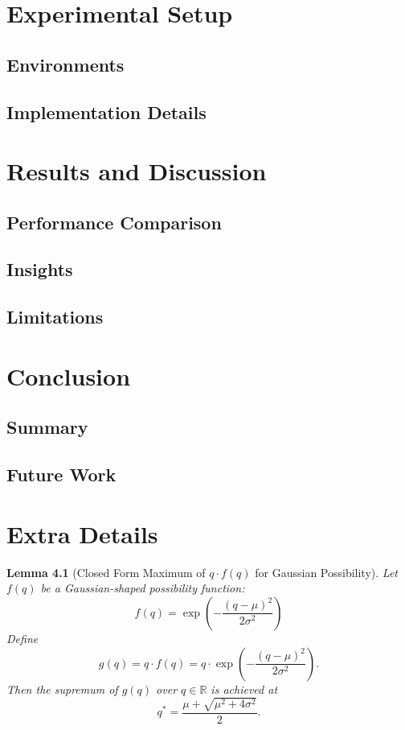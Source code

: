\documentclass[12pt,a4paper]{report}
\newtheorem{lemma}{Lemma}
\begin{document}
\chapter{Experimental Setup}
\section{Environments}
\section{Implementation Details}

\chapter{Results and Discussion}
\section{Performance Comparison}
\section{Insights}
\section{Limitations}

\chapter{Conclusion}
\section{Summary}
\section{Future Work}




\appendix

\chapter{Extra Details}

\begin{lemma}[Closed Form Maximum of $q \cdot f(q)$ for Gaussian Possibility]
\label{lem:max_expected_gauss}
Let $f(q)$ be a Gaussian-shaped possibility function: 
\[ f(q) = \exp\left(-\frac{(q - \mu)^2}{2\sigma^2} \right) \]
Define
\[
g(q) = q \cdot f(q) = q \cdot \exp\left(-\frac{(q - \mu)^2}{2\sigma^2} \right).
\]
Then the supremum of \( g(q) \) over \( q \in \mathbb{R} \) is achieved at
\[
q^* = \frac{\mu + \sqrt{\mu^2 + 4\sigma^2}}{2}.
\]
\end{lemma}
\end{document}
